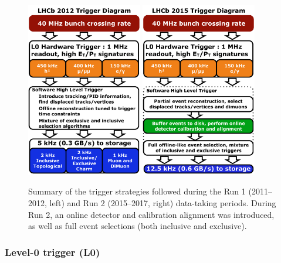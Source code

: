 \begin{figure}[htbp]
  \begin{center}
    \includegraphics[width=0.45\textwidth]{02LHCb/figs/TriggerRunI.pdf}
    \includegraphics[width=0.45\textwidth]{02LHCb/figs/TriggerRunII.pdf}
  \end{center}
  \vspace{-2mm}
  \caption{Summary of the trigger strategies followed during the Run 1 (2011--2012, left) and Run 2 (2015--2017, right) data-taking periods. During Run 2, an online detector and calibration alignment was introduced, as well as full event selections (both inclusive and exclusive).}
  \label{fig:trigger}
\end{figure}

\subsubsection*{Level-0 trigger (L0)}

